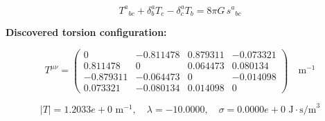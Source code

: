 
\begin{equation}
  T^a{}_{bc} + \delta^a_b T_c - \delta^a_c T_b = 8\pi G \, s^a{}_{bc}
\end{equation}

\textbf{Discovered torsion configuration:}

\begin{equation}
  T^{\mu\nu} = \begin{pmatrix}
    0 & -0.811478 & 0.879311 & -0.073321 \\
    0.811478 & 0 & 0.064473 & 0.080134 \\
    -0.879311 & -0.064473 & 0 & -0.014098 \\
    0.073321 & -0.080134 & 0.014098 & 0
  \end{pmatrix} \quad \text{m}^{-1}
\end{equation}

\begin{equation}
  |T| = 1.2033e+0 \text{ m}^{-1}, \quad
  \lambda = -10.0000, \quad
  \sigma = 0.0000e+0 \text{ J}\cdot\text{s/m}^3
\end{equation}